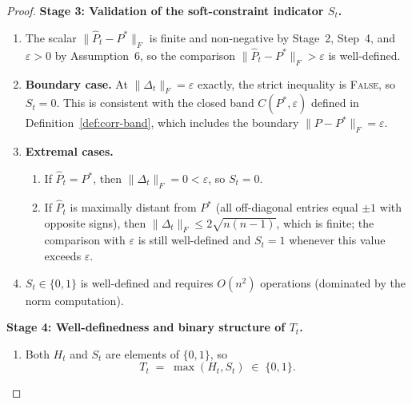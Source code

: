 \documentclass[12pt,openany]{book}
\newcommand{\calC}{\mathcal{C}}
\numberwithin{equation}{chapter}
\theoremstyle{plain}
\theoremstyle{definition}
\theoremstyle{remark}
\def\mathcal#1{#1}%
\def\calC{C}%
\begin{document}
\begin{proof}
\medskip
\noindent\textbf{Stage 3: Validation of the soft-constraint
indicator $S_t$.}
\begin{enumerate}
  \item The scalar $\|\hat{P}_t - P^*\|_F$ is finite and
        non-negative by Stage~2, Step~4, and $\varepsilon > 0$
        by Assumption~6, so the comparison
        $\|\hat{P}_t - P^*\|_F > \varepsilon$ is well-defined.

  \item \textbf{Boundary case.}
        At $\|\Delta_t\|_F = \varepsilon$ exactly, the strict
        inequality is \textsc{False}, so $S_t = 0$.  This is
        consistent with the closed band
        $\calC(P^*, \varepsilon)$ defined in
        Definition~\ref{def:corr-band}, which includes the boundary
        $\|P - P^*\|_F = \varepsilon$.

  \item \textbf{Extremal cases.}
        \begin{enumerate}
          \item If $\hat{P}_t = P^*$, then
                $\|\Delta_t\|_F = 0 < \varepsilon$, so $S_t = 0$.
          \item If $\hat{P}_t$ is maximally distant from $P^*$
                (all off-diagonal entries equal $\pm 1$ with opposite
                signs), then $\|\Delta_t\|_F \leq 2\sqrt{n(n-1)}$,
                which is finite; the comparison with $\varepsilon$ is
                still well-defined and $S_t = 1$ whenever this
                value exceeds $\varepsilon$.
        \end{enumerate}

  \item $S_t \in \{0,1\}$ is well-defined and requires
        $O(n^2)$ operations (dominated by the norm computation).
\end{enumerate}

\medskip
\noindent\textbf{Stage 4: Well-definedness and binary structure
of $T_t$.}
\begin{enumerate}
  \item Both $H_t$ and $S_t$ are elements of $\{0,1\}$, so
        \begin{equation}
          T_t \;=\; \max(H_t, S_t) \;\in\; \{0,1\}.
          \label{eq:trigger-binary}
        \end{equation}


\end{enumerate}
\end{proof}
\end{document}
